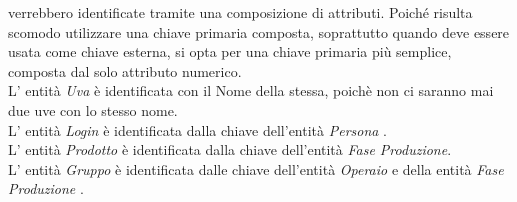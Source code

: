 \documentclass{article}
\begin{document}
\begin{itemize}
\begin{itemize}
\end{itemize} 
verrebbero identificate tramite una composizione di attributi. Poiché risulta scomodo utilizzare una chiave primaria composta, soprattutto quando deve essere usata come chiave esterna, si opta per una chiave primaria più semplice, composta dal solo attributo numerico.\\
L' entità \textit{Uva} è identificata con il Nome della stessa, poichè non ci saranno mai due uve con lo stesso nome.\\
L' entità \textit{Login} è identificata dalla chiave dell'entità  \textit{Persona} .\\
L' entità \textit{Prodotto}  è identificata dalla chiave dell'entità  \textit{Fase Produzione}.\\
L' entità \textit{Gruppo} è identificata dalle chiave dell'entità \textit{Operaio} e della entità \textit{Fase Produzione} .\\
\end{itemize}
\end{document}

